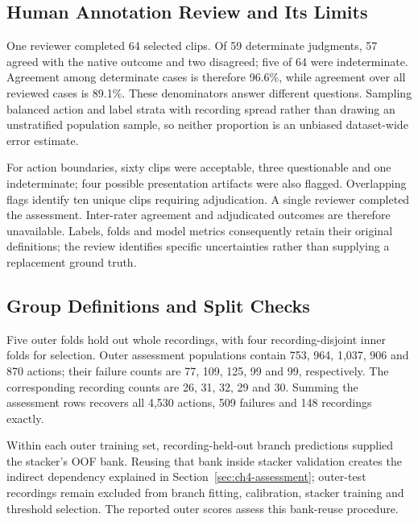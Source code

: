 \subsection{Human Annotation Review and Its Limits}
One reviewer completed 64 selected clips. Of 59 determinate judgments, 57 agreed with
the native outcome and two disagreed; five of 64 were indeterminate. Agreement among
determinate cases is therefore 96.6\%, while agreement over all reviewed cases is
89.1\%. These denominators answer different questions. Sampling balanced action and
label strata with recording spread rather than drawing an unstratified population
sample, so neither proportion is an unbiased dataset-wide error estimate.

For action boundaries, sixty clips were acceptable, three questionable and one
indeterminate; four possible presentation artifacts were also flagged. Overlapping flags
identify ten unique clips requiring adjudication. A single reviewer completed the
assessment. Inter-rater agreement and adjudicated outcomes are therefore unavailable.
Labels, folds and model metrics consequently retain their original definitions; the
review identifies specific uncertainties rather than supplying a replacement ground
truth.

\subsection{Group Definitions and Split Checks}
Five outer folds hold out whole recordings, with four recording-disjoint inner folds for
selection. Outer assessment populations contain 753, 964, 1,037, 906 and 870 actions;
their failure counts are 77, 109, 125, 99 and 99, respectively. The corresponding
recording counts are 26, 31, 32, 29 and 30. Summing the assessment rows recovers all
4,530 actions, 509 failures and 148 recordings exactly.

Within each outer training set, recording-held-out branch predictions supplied the
stacker's OOF bank. Reusing that bank inside stacker validation creates the indirect
dependency explained in Section~\ref{sec:ch4-assessment}; outer-test recordings remain
excluded from branch fitting, calibration, stacker training and threshold selection.
The reported outer scores assess this bank-reuse procedure.

